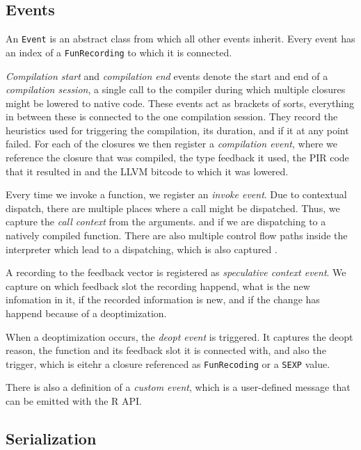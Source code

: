 \subsection{Events}

An \texttt{Event} is an abstract class from which all other events inherit. Every event has an index of a \texttt{FunRecording} to which it is connected.

\textit{Compilation start} and \textit{compilation end} events denote the start and end of a \textit{compilation session}, a single call to the compiler during which multiple closures might be lowered to native code. These events act as brackets of sorts, everything in between these is connected to the one compilation session. They record the heuristics used for triggering the compilation, its duration, and if it at any point failed. For each of the closures we then register a \textit{compilation event}, where we reference the closure that was compiled, the type feedback it used, the PIR code that it resulted in and the LLVM bitcode to which it was lowered.

Every time we invoke a function, we register an \textit{invoke event}. Due to contextual dispatch, there are multiple places where a call might be dispatched. Thus, we capture the \textit{call context} from the arguments. and if we are dispatching to a natively compiled function. There are also multiple control flow paths inside the interpreter which lead to a dispatching, which is also captured .

A recording to the feedback vector is registered as \textit{speculative context event}. We capture on which feedback slot the recording happend, what is the new infomation in it, if the recorded information is new, and if the change has happend because of a deoptimization.

When a deoptimization occurs, the \textit{deopt event} is triggered. It captures the deopt reason, the function and its feedback slot it is connected with, and also the trigger, which is eitehr a closure referenced as \texttt{FunRecoding} or a \texttt{SEXP} value.

There is also a definition of a \textit{custom event}, which is a user-defined message that can be emitted with the R API.

\subsection{Serialization}

